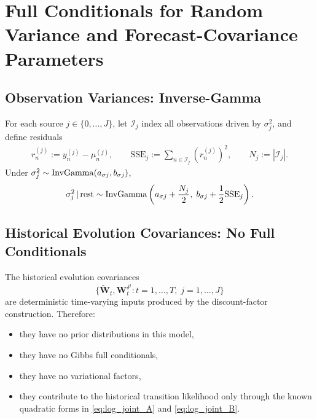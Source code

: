 \section{Full Conditionals for Random Variance and Forecast-Covariance Parameters}

\subsection{Observation Variances: Inverse-Gamma}
For each source $j\in\{0,\dots,J\}$, let $\mathcal{I}_j$ index all observations driven by $\sigma_j^2$,
and define residuals
\begin{align}
r_n^{(j)} := y_n^{(j)}-\mu_n^{(j)}, \qquad \mathrm{SSE}_j := \sum_{n\in\mathcal{I}_j} \left(r_n^{(j)}\right)^2,
\qquad N_j:=|\mathcal{I}_j|.
\end{align}
Under $\sigma_j^2\sim\mathrm{InvGamma}(a_{\sigma j},b_{\sigma j})$,
\begin{align}
\sigma_j^2\,|\,\text{rest}
\sim \mathrm{InvGamma}\left(a_{\sigma j}+\frac{N_j}{2},\; b_{\sigma j}+\frac{1}{2}\mathrm{SSE}_j\right).
\label{eq:cond_sigma}
\end{align}

\subsection{Historical Evolution Covariances: No Full Conditionals}
The historical evolution covariances
\[
\{\tilde{\bm W}_t,\bm W_t^{\delta^j}\colon t=1,\dots,T,\; j=1,\dots,J\}
\]
are deterministic time-varying inputs produced by the discount-factor construction.
Therefore:
\begin{itemize}
\item they have no prior distributions in this model,
\item they have no Gibbs full conditionals,
\item they have no variational factors,
\item they contribute to the historical transition likelihood only through the known quadratic
      forms in \eqref{eq:log_joint_A} and \eqref{eq:log_joint_B}.
\end{itemize}

